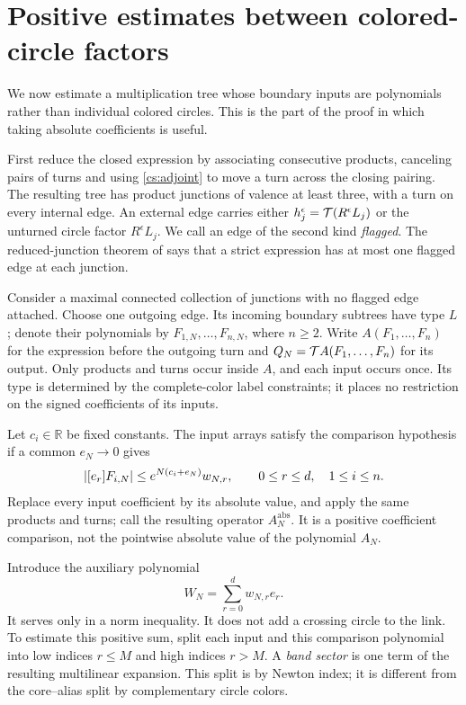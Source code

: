\section{Positive estimates between colored-circle factors}\label{cs:probe}

We now estimate a multiplication tree whose boundary inputs are
polynomials rather than individual colored circles. This is the part
of the proof in which taking absolute coefficients is useful.

First reduce the closed expression by associating consecutive products,
canceling pairs of turns and using \eqref{cs:adjoint} to move a turn
across the closing pairing. The resulting tree has product junctions
of valence at least three, with a turn on every internal edge. An
external edge carries either $h_j^\epsilon=\mathcal T(R^\epsilon L_j)$ or
the unturned circle factor $R^\epsilon L_j$. We call an edge of the
second kind \emph{flagged}. The reduced-junction theorem of
\cite[Theorem 5.5]{Newton} says that a strict expression has at most
one flagged edge at each junction.

Consider a maximal connected collection of junctions with no flagged
edge attached. Choose one outgoing edge. Its incoming boundary
subtrees have type $L$; denote their polynomials by $F_{1,N},\ldots,F_{n,N}$,
where $n\ge2$. Write $A(F_1,\ldots,F_n)$ for the expression before
the outgoing turn and $Q_N=\mathcal T A(F_1,\ldots,F_n)$ for its output.
Only products and turns occur inside $A$, and each input occurs once.
Its type is determined by the complete-color label constraints; it
places no restriction on the signed coefficients of its inputs.

\begin{definition}
Let \(c_i\in\mathbb R\) be fixed constants. The input arrays satisfy
the comparison hypothesis if a common \(e_N\to0\) gives
\begin{equation}\label{cs:cone}
 |[e_{r}]F_{i,N}|\le e^{N(c_i+e_N)}w_{N,r},
       \qquad 0\le r\le d,\quad 1\le i\le n.
\end{equation}
Replace every input coefficient by its absolute value, and apply the
same products and turns; call the resulting operator \(A_N^{\mathrm{abs}}\).
It is a positive coefficient comparison, not the pointwise absolute
value of the polynomial \(A_N\).
\end{definition}

Introduce the auxiliary polynomial
\begin{equation}\label{cs:probe-polynomial}
 W_N=\sum_{r=0}^{d}w_{N,r}e_r.
\end{equation}
It serves only in a norm inequality. It does not add a crossing circle
to the link. To estimate this positive sum, split each input and this
comparison polynomial into low indices $r\le M$ and high indices
$r>M$. A \emph{band sector} is one term of the resulting multilinear
expansion. This split is by Newton index; it is different from the
core--alias split by complementary circle colors.

